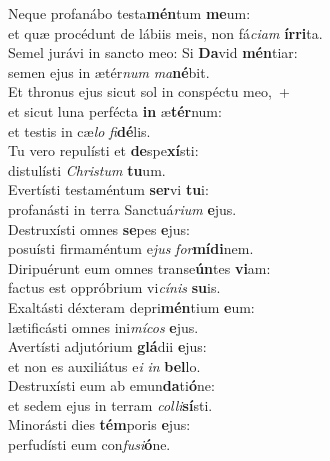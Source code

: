\evenverse Neque profanábo testa\textbf{mén}tum \textbf{me}um:~\*\\
\evenverse et quæ procédunt de lábiis meis, non fá\textit{ci}\textit{am} \textbf{ír}\textbf{ri}ta.\\
\oddverse Semel jurávi in sancto meo: Si \textbf{Da}vid \textbf{mén}tiar:~\*\\
\oddverse semen ejus in ætér\textit{num} \textit{ma}\textbf{né}bit.\\
\evenverse Et thronus ejus sicut sol in conspéctu meo,~+\\
\evenverse  et sicut luna perfécta \textbf{in} æ\textbf{tér}num:~\*\\
\evenverse et testis in cæ\textit{lo} \textit{fi}\textbf{dé}lis.\\
\oddverse Tu vero repulísti et \textbf{de}spe\textbf{xí}sti:~\*\\
\oddverse distulísti \textit{Chri}\textit{stum} \textbf{tu}um.\\
\evenverse Evertísti testaméntum \textbf{ser}vi \textbf{tu}i:~\*\\
\evenverse profanásti in terra Sanctuá\textit{ri}\textit{um} \textbf{e}jus.\\
\oddverse Destruxísti omnes \textbf{se}pes \textbf{e}jus:~\*\\
\oddverse posuísti firmaméntum e\textit{jus} \textit{for}\textbf{mí}\textbf{di}nem.\\
\evenverse Diripuérunt eum omnes transe\textbf{ún}tes \textbf{vi}am:~\*\\
\evenverse factus est oppróbrium vi\textit{cí}\textit{nis} \textbf{su}is.\\
\oddverse Exaltásti déxteram depri\textbf{mén}tium \textbf{e}um:~\*\\
\oddverse lætificásti omnes ini\textit{mí}\textit{cos} \textbf{e}jus.\\
\evenverse Avertísti adjutórium \textbf{glá}dii \textbf{e}jus:~\*\\
\evenverse et non es auxiliátus e\textit{i} \textit{in} \textbf{bel}lo.\\
\oddverse Destruxísti eum ab emun\textbf{da}ti\textbf{ó}ne:~\*\\
\oddverse et sedem ejus in terram \textit{col}\textit{li}\textbf{sí}sti.\\
\evenverse Minorásti dies \textbf{tém}poris \textbf{e}jus:~\*\\
\evenverse perfudísti eum con\textit{fu}\textit{si}\textbf{ó}ne.\\
